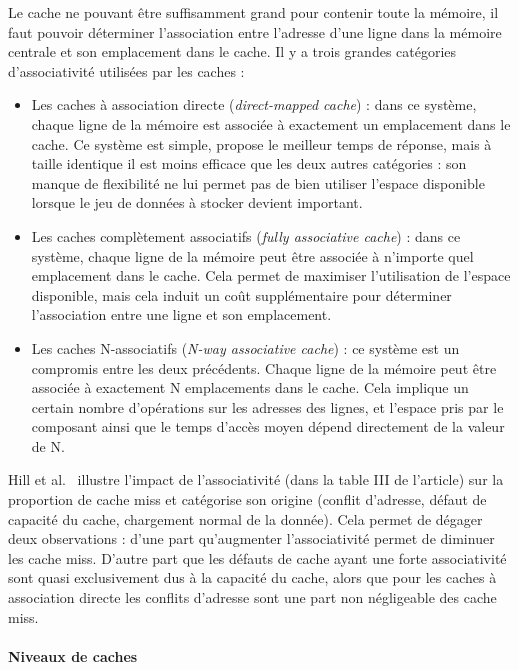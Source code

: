 Le cache ne pouvant être suffisamment grand pour contenir toute la mémoire, il faut pouvoir déterminer l'association entre l'adresse d'une ligne dans la mémoire centrale et son emplacement dans le cache.
Il y a trois grandes catégories d'associativité utilisées par les caches :
\begin{itemize}
  \item Les caches à association directe (\emph{direct-mapped cache}) : dans ce système, chaque ligne de la mémoire est associée à exactement un emplacement dans le cache.
    Ce système est simple, propose le meilleur temps de réponse, mais à taille identique il est moins efficace que les deux autres catégories : son manque de flexibilité ne lui permet pas de bien utiliser l'espace disponible lorsque le jeu de données à stocker devient important.
  \item Les caches complètement associatifs (\emph{fully associative cache}) : dans ce système, chaque ligne de la mémoire peut être associée à n'importe quel emplacement dans le cache.
    Cela permet de maximiser l'utilisation de l'espace disponible, mais cela induit un coût supplémentaire pour déterminer l'association entre une ligne et son emplacement.
  \item Les caches N-associatifs (\emph{N-way associative cache}) : ce système est un compromis entre les deux précédents.
    Chaque ligne de la mémoire peut être associée à exactement N emplacements dans le cache.
    Cela implique un certain nombre d'opérations sur les adresses des lignes, et l'espace pris par le composant ainsi que le temps d'accès moyen dépend directement de la valeur de N.
\end{itemize}

Hill et al.~\cite{Hill1989} illustre l'impact de l'associativité (dans la table III de l'article) sur la proportion de cache miss et catégorise son origine (conflit d'adresse, défaut de capacité du cache, chargement normal de la donnée).
Cela permet de dégager deux observations : d'une part qu'augmenter l'associativité permet de diminuer les cache miss.
D'autre part que les défauts de cache ayant une forte associativité sont quasi exclusivement dus à la capacité du cache, alors que pour les caches à association directe les conflits d'adresse sont une part non négligeable des cache miss.

\paragraph{Niveaux de caches}


